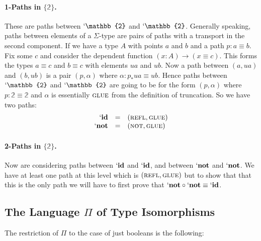 \documentclass[format=acmlarge,review,natbib]{acmart}
\newcommand{\reflp}{\textsc{refl}}
\newcommand{\notp}{\textsc{not}}
\newcommand{\gluep}{\textsc{glue}}
\newcommand{\bt}{\mathbb{2}}
\begin{document}
\paragraph*{1-Paths in $\{\bt\}$.} These are paths between $`\bt$ and
$`\bt$. Generally speaking, paths between elements of a $\Sigma$-type are pairs
of paths with a transport in the second component. If we have a type $A$ with
points $a$ and $b$ and a path $p : a \equiv b$. Fix some $c$ and consider the
dependent function $(x:A) \rightarrow (x \equiv c)$. This forms the types
$a\equiv c$ and $b\equiv c$ with elements $ua$ and $ub$. Now a path between
$(a,ua)$ and $(b,ub)$ is a pair $(p,\alpha)$ where $\alpha : p_* ua \equiv
ub$. Hence paths between $`\bt$ and $`\bt$ are going to be for the form
$(p,\alpha)$ where $p : \bt \equiv \bt$ and $\alpha$ is essentially $\gluep$
from the definition of truncation. So we have two paths:
\[\begin{array}{rcl}
`\mathbf{id} &=& (\reflp,\gluep) \\
`\mathbf{not} &=& (\notp,\gluep)
\end{array}\]

\paragraph*{2-Paths in $\{\bt\}$.} Now are considering paths between
$`\mathbf{id}$ and $`\mathbf{id}$, and between $`\mathbf{not}$ and
$`\mathbf{not}$. We have at least one path at this level which is
$(\reflp,\gluep)$ but to show that that this is the only path we will have to
first prove that $`\mathbf{not} \circ `\mathbf{not} \equiv `\mathbf{id}$.



\subsection{The Language $\Pi$ of Type Isomorphisms}

The restriction of $\Pi$ to the case of just booleans is the following:
\end{document}
